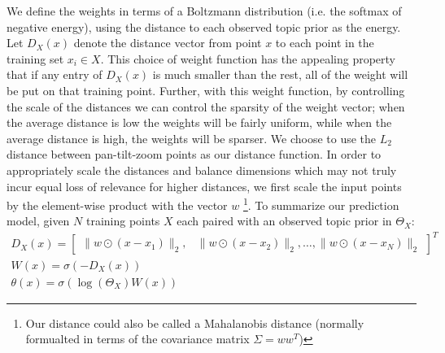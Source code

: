 We define the weights in terms of a Boltzmann distribution (i.e. the softmax of negative energy), using the distance to each observed topic prior as the energy. Let $D_X(x)$ denote the distance vector from point $x$ to each point in the training set $x_i \in X$. This choice of weight function has the appealing property that if any entry of $D_X(x)$ is much smaller than the rest, all of the weight will be put on that training point. Further, with this weight function, by controlling the scale of the distances we can control the sparsity of the weight vector; when the average distance is low the weights will be fairly uniform, while when the average distance is high, the weights will be sparser. We choose to use the $\mathit{L}_2$ distance between pan-tilt-zoom points as our distance function. In order to appropriately scale the distances and balance dimensions which may not truly incur equal loss of relevance for higher distances, we first scale the input points by the element-wise product with the vector $w$ \footnote{Our distance could also be called a Mahalanobis distance (normally formualted in terms of the covariance matrix $\Sigma = ww^T$)}. To summarize our prediction model, given $N$ training points $X$ each paired with an observed topic prior in $\Theta_X$:
\begin{equation} \label{eqn:spatial-prediction}
\begin{split}
    D_X(x) = 
    \begin{bmatrix}
    \|w \odot (x - x_1) \|_2, & \|w \odot (x - x_2) \|_2, \ldots, \|w \odot (x - x_N) \|_2
    \end{bmatrix}^T\\
    W(x) = \sigma \left( -D_{X}(x) \right)\\
    \theta(x) = \sigma \left( \log \left(\Theta_X \right) W(x) \right)
\end{split}
\end{equation}

